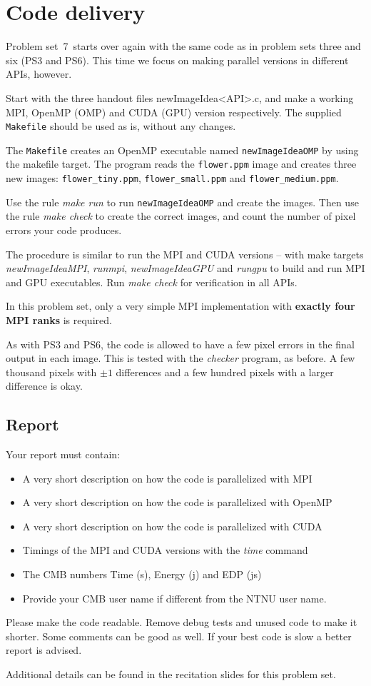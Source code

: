 \documentclass[10pt,a4paper]{article}
\newcommand{\PROBSET}{7}
\begin{document}
\section*{Code delivery}
%
Problem set~\PROBSET\ starts over again with the same code as in problem sets
three and six (PS3 and PS6). This time we focus on making parallel versions in
different APIs, however.

Start with the three handout files newImageIdea<API>.c, and make a working MPI,
OpenMP (OMP) and CUDA (GPU) version respectively. The supplied
\texttt{Makefile} should be used as is, without any changes.

The \texttt{Makefile} creates an OpenMP executable named
\texttt{newImageIdeaOMP} by using the makefile target. The program reads the \texttt{flower.ppm} image
and creates three new images: \texttt{flower\_tiny.ppm},
\texttt{flower\_small.ppm} and \texttt{flower\_medium.ppm}.

Use the rule \textit{make run} to run \texttt{newImageIdeaOMP} and create the
images. Then use the rule \textit{make check} to create the correct images, and
count the number of pixel errors your code produces.

The procedure is similar to run the MPI and CUDA versions -- with make targets
\textit{newImageIdeaMPI}, \textit{runmpi}, \textit{newImageIdeaGPU} and \textit{rungpu}
to build and run MPI and GPU executables. Run \textit{make check} for
verification in all APIs.

In this problem set, only a very simple MPI implementation with \textbf{exactly
four MPI ranks} is required.

As with PS3 and PS6, the code is allowed to have a few pixel errors in the
final output in each image. This is tested with the \textit{checker} program,
as before. A few thousand pixels with $\pm 1$ differences and a few hundred
pixels with a larger difference is okay.

\subsection*{Report}
Your report must contain:
%
\begin{itemize}
	\item A very short description on how the code is parallelized with MPI
	\item A very short description on how the code is parallelized with OpenMP
	\item A very short description on how the code is parallelized with CUDA
	\item Timings of the MPI and CUDA versions with the \textit{time} command
	\item The CMB numbers Time (s), Energy (j) and EDP (js)
	\item Provide your CMB user name if different from the NTNU user name.
\end{itemize}

Please make the code readable. Remove debug tests and unused code to make it
shorter. Some comments can be good as well. If your best code is slow a better
report is advised.

Additional details can be found in the recitation slides for this problem set.
\end{document}
